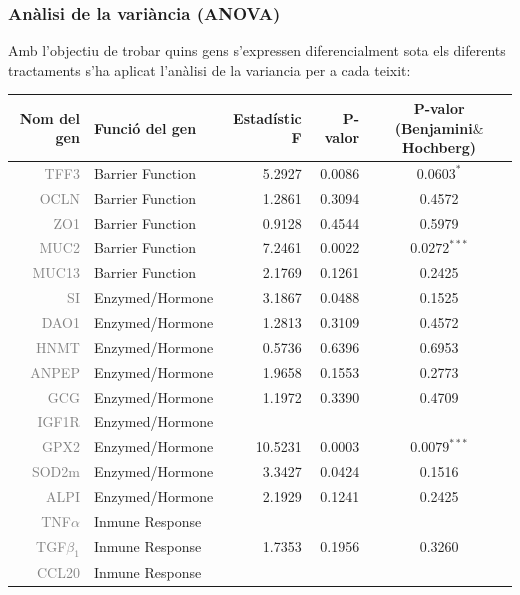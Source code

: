 \documentclass[english]{article}
\begin{document}
\subsubsection{Anàlisi de la variància (ANOVA)}
Amb l'objectiu de trobar quins gens s'expressen diferencialment sota els diferents tractaments s'ha aplicat l'anàlisi de la variancia per a cada teixit:
\begin{table}[ht]
\centering
\begin{tabular}{rlrrc}
    \toprule
{\textbf{Nom del gen}} & {\textbf{Funció del gen }} & {\textbf{Estadístic F}} & {\textbf{P-valor}} & {\textbf{P-valor (Benjamini$\&$Hochberg)}} \\
  \midrule
{\textcolor{gray}{TFF3}} & Barrier Function & 5.2927 & 0.0086 & $0.0603^{*}$ \\
  {\textcolor{gray}{OCLN}} & Barrier Function & 1.2861 & 0.3094 & 0.4572 \\
  {\textcolor{gray}{ZO1}} & Barrier Function & 0.9128 & 0.4544 & 0.5979 \\
  {\textcolor{gray}{MUC2}} & Barrier Function & 7.2461 & 0.0022 & $0.0272^{***}$ \\
  {\textcolor{gray}{MUC13}} & Barrier Function & 2.1769 & 0.1261 & 0.2425 \\
  {\textcolor{gray}{SI}} & Enzymed/Hormone & 3.1867 & 0.0488 & 0.1525 \\
  {\textcolor{gray}{DAO1}} & Enzymed/Hormone & 1.2813 & 0.3109 & 0.4572 \\
  {\textcolor{gray}{HNMT}} & Enzymed/Hormone & 0.5736 & 0.6396 & 0.6953 \\
  {\textcolor{gray}{ANPEP}} & Enzymed/Hormone & 1.9658 & 0.1553 & 0.2773 \\
  {\textcolor{gray}{GCG}} & Enzymed/Hormone & 1.1972 & 0.3390 & 0.4709 \\
  {\textcolor{gray}{IGF1R}} & Enzymed/Hormone &  &  &  \\
  {\textcolor{gray}{GPX2}} & Enzymed/Hormone & 10.5231 & 0.0003 & $0.0079^{***}$\\
  {\textcolor{gray}{SOD2m}} & Enzymed/Hormone & 3.3427 & 0.0424 & 0.1516 \\
  {\textcolor{gray}{ALPI}} & Enzymed/Hormone & 2.1929 & 0.1241 & 0.2425 \\
  {\textcolor{gray}{TNF$\alpha$}} & Inmune Response &  &  &  \\
  {\textcolor{gray}{TGF$\beta_1$}} & Inmune Response & 1.7353 & 0.1956 & 0.3260 \\
  {\textcolor{gray}{CCL20}} & Inmune Response &  &  &  \\

\end{tabular}
\end{table}
\end{document}
